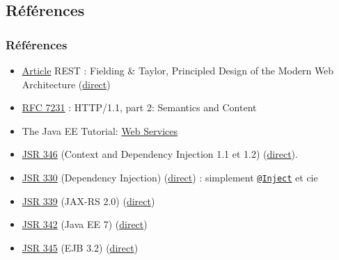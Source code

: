 \documentclass[english, french]{beamer}
\begin{document}
\subsection{Références}
\begin{frame}
	\frametitle{Références}
	\begin{itemize}
		\item \href{http://doi.org/10.1145/337180.337228}{Article} REST : Fielding \& Taylor, Principled Design of the Modern Web Architecture (\href{https://www.ics.uci.edu/~fielding/pubs/webarch_icse2000.pdf}{direct})%
		\item \href{http://www.w3.org/Protocols/}{RFC 7231} : HTTP/1.1, part 2: Semantics and Content
		\item The Java EE Tutorial: \href{http://docs.oracle.com/javaee/7/tutorial/partwebsvcs.htm}{Web Services}
		\item \href{https://jcp.org/en/jsr/detail?id=346}{JSR 346} (Context and Dependency Injection 1.1 et 1.2) (\href{http://download.oracle.com/otn-pub/jcp/cdi-1_2-mrel-eval-spec/cdi-1.2.pdf}{direct}).
		\item \href{https://jcp.org/en/jsr/detail?id=330}{JSR 330} (Dependency Injection) (\href{http://download.oracle.com/otn-pub/jcp/dependency_injection-1.0-final-oth-JSpec/dependency_injection-1_0-final-spec.zip}{direct}) : simplement \href{http://docs.oracle.com/javaee/7/api/javax/inject/Inject.html}{\texttt{@Inject}} et cie
		\item \href{https://jcp.org/en/jsr/detail?id=339}{JSR 339} (JAX-RS 2.0) (\href{http://download.oracle.com/otn-pub/jcp/jaxrs-2_0_rev_A-mrel-eval-spec/jsr339-jaxrs-2.0-final-spec.pdf}{direct})
		\item \href{https://jcp.org/en/jsr/detail?id=342}{JSR 342} (Java EE 7) (\href{http://download.oracle.com/otn-pub/jcp/java_ee-7-mrel-eval-spec/JavaEE_Platform_Spec.pdf}{direct})
		\item \href{https://jcp.org/en/jsr/detail?id=345}{JSR 345} (EJB 3.2) (\href{http://download.oracle.com/otn-pub/jcp/ejb-3_2-fr-eval-spec/ejb-3_2-core-fr-spec.pdf}{direct})
	\end{itemize}
\end{frame}
\end{document}
